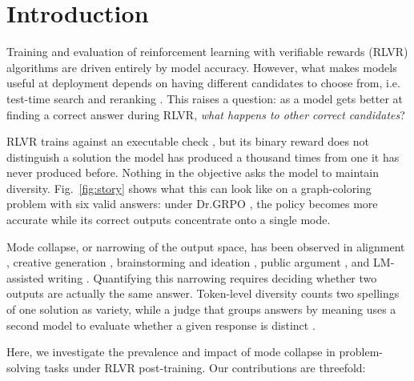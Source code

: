 \section{Introduction}
\label{sec:introduction}

Training and evaluation of reinforcement learning with verifiable rewards (RLVR) algorithms are driven entirely by model accuracy.
However, what makes models useful at deployment depends on having different candidates to choose from, i.e. test-time search and reranking \citep{brown2024monkeys,snell2024testtime,cobbe2021training,wang2023selfconsistency}. This raises a question: as a model gets better at finding a correct answer during RLVR, \textit{what happens to other correct candidates}?

RLVR trains against an executable check \citep{guo2025deepseekr1}, but its binary reward does not distinguish a solution the model has produced a thousand times from one it has never produced before.
Nothing in the objective asks the model to maintain diversity.
Fig.~\ref{fig:story} shows what this can look like on a graph-coloring problem with six valid answers: under Dr.GRPO \citep{liu2025understanding}, the policy becomes more accurate while its correct outputs concentrate onto a single mode.

Mode collapse, or narrowing of the output space, has been observed in alignment \citep{kirk2024understanding,cui2025entropy}, creative generation \citep{doshi2024generative}, brainstorming and ideation \citep{anderson2024homogenization}, public argument \citep{kim2026argument}, and LM-assisted writing \citep{abdulhai2026distort}. 
Quantifying this narrowing requires deciding whether two outputs are actually the same answer. 
Token-level diversity \citep{li2016diversity,zhu2018texygen} counts two spellings of one solution as variety, while a judge that groups answers by meaning uses a second model to evaluate whether a given response is distinct \citep{farquhar2024detecting,zheng2023judging}.

Here, we investigate the prevalence and impact of mode collapse in problem-solving tasks under RLVR post-training. Our contributions are threefold:

